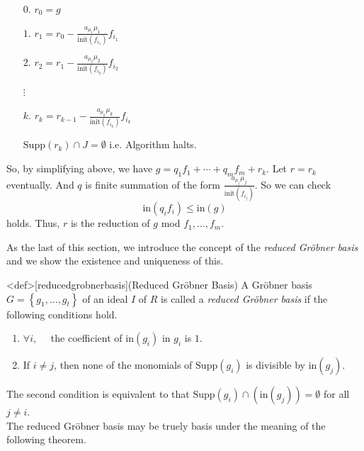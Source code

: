 \documentclass{article}
\begin{document}
\begin{pfsp}
\begin{enumerate}
        \item[$0$.] $\displaystyle{r_0=g}$
        \item[$1$.] $\displaystyle{r_1 = r_0 - \frac{a_{\mu_1} \mu_1}{\mathrm{init}(f_{i_1})} f_{i_1}}$
        \item[$2$.] $\displaystyle{r_2 = r_1 - \frac{a_{\mu_2} \mu_2}{\mathrm{init}(f_{i_2})} f_{i_2}}$
        \item[] $\vdots$
        \item[$k$.] $\displaystyle{r_k = r_{k-1} - \frac{a_{\mu_k} \mu_k}{\mathrm{init}(f_{i_k})} f_{i_k}}$
        \item[] $\mathrm{Supp}(r_k) \cap J = \emptyset$ i.e. Algorithm halts.
    \end{enumerate}
    So, by simplifying above, we have $g = q_1 f_1 + \cdots + q_m f_m + r_k$. Let $r = r_k$ eventually. And $q$ is finite summation of the form $\displaystyle{\frac{a_{\mu_j} \mu_j}{\mathrm{init}(f_{i_j})}}$. So we can check $$\mathrm{in}(q_i f_i) \leq \mathrm{in}(g)$$ holds. Thus, $r$ is the reduction of $g$ mod $f_1, \ldots, f_m$.
\end{pfsp}

As the last of this section, we introduce the concept of the \textit{reduced Gr\"{o}bner basis} and we show the existence and uniqueness of this. 

\begin{statementsp}<def>[reducedgrobnerbasis](Reduced Gr\"{o}bner Basis)
    A Gr\"{o}bner basis $G = \left\{ g_1, \ldots, g_t \right\}$ of an ideal $I$ of $R$ is called a \textit{reduced Gr\"{o}bner basis} if the following conditions hold.
    \begin{enumerate}
        \item $\forall i, \quad$ the coefficient of $\mathrm{in}(g_i)$ in $g_i$ is $1$. 
        \item If $i \neq j$, then none of the monomials of $\mathrm{Supp}(g_i)$ is divisible by $\mathrm{in}(g_j)$. 
    \end{enumerate}
\end{statementsp}

The second condition is equivalent to that $\mathrm{Supp}(g_i) \cap \left(  \mathrm{in}(g_j) \right) = \emptyset$ for all $j \neq i$.\\ 
The reduced Gr\"{o}bner basis may be truely basis under the meaning of the following theorem. 
\end{document}
